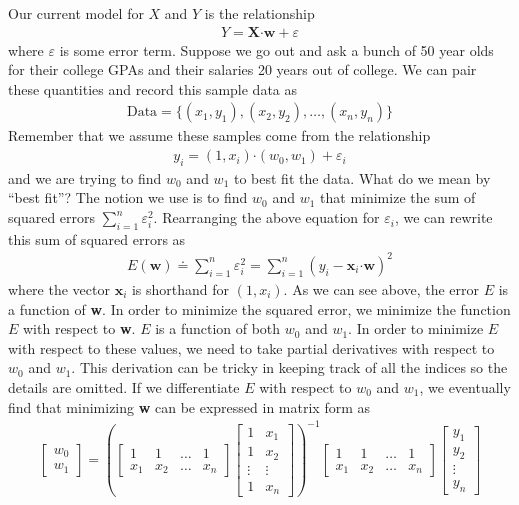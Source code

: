 \documentclass[11pt,letterpaper]{article}
\newcommand\eps{\varepsilon}
\numberwithin{theorem}{section}
\numberwithin{definition}{section}
\numberwithin{lemma}{section}
\numberwithin{corollary}{section}
\numberwithin{proposition}{section}
\theoremstyle{definition}
\numberwithin{remark}{section}
\numberwithin{claim}{section}
\numberwithin{observation}{section}
\numberwithin{fact}{section}
\numberwithin{assumption}{section}
\numberwithin{example}{section}
\numberwithin{exercise}{section}
\begin{document}
Our current model for $X$ and $Y$ is the relationship
\begin{align*}
Y = \textbf{X} \boldsymbol{\cdot} \textbf{w} + \eps
\end{align*}
where $\eps$ is some error term. Suppose we go out and ask a bunch of 50 year olds for their college GPAs and their salaries 20 years out of college. We can pair these quantities and record this sample data as
\begin{align*}
\text{Data} = \{(x_1,y_1),(x_2,y_2),\dots,(x_n,y_n)\}
\end{align*}
Remember that we assume these samples come from the relationship
\begin{align*}
y_i = (1,x_i) \boldsymbol{\cdot} (w_0,w_1) + \eps_i
\end{align*}
and we are trying to find $w_0$ and $w_1$ to best fit the data. What do we mean by ``best fit''? The notion we use is to find $w_0$ and $w_1$ that minimize the sum of squared errors $\sum_{i=1}^n\eps_i^2$. Rearranging the above equation for $\eps_i$, we can rewrite this sum of squared errors as
\begin{align*}
E(\textbf{w}) \doteq \sum_{i=1}^n\eps_i^2 = \sum_{i=1}^n (y_i - \textbf{x}_i \boldsymbol{\cdot} \textbf{w})^2
\end{align*}
where the vector $\textbf{x}_i$ is shorthand for $(1,x_i)$. As we can see above, the error $E$ is a function of \textbf{w}. In order to minimize the squared error, we minimize the function $E$ with respect to \textbf{w}. $E$ is a function of both $w_0$ and $w_1$. In order to minimize $E$ with respect to these values, we need to take partial derivatives with respect to $w_0$ and $w_1$. This derivation can be tricky in keeping track of all the indices so the details are omitted. If we differentiate $E$ with respect to $w_0$ and $w_1$, we eventually find that minimizing \textbf{w} can be expressed in matrix form as
\begin{align*}
\begin{bmatrix}
w_0 \\
w_1
\end{bmatrix} = 
\left(\begin{bmatrix}
1 & 1 & \dots & 1 \\
x_1 & x_2 & \dots & x_n
\end{bmatrix}
\begin{bmatrix}
1 & x_1 \\
1 & x_2 \\
\vdots & \vdots \\
1 & x_n
\end{bmatrix}
\right)^{-1}
\begin{bmatrix}
1 & 1 & \dots & 1 \\
x_1 & x_2 & \dots & x_n
\end{bmatrix}
\begin{bmatrix}
y_1  \\
y_2  \\
\vdots  \\
y_n 
\end{bmatrix}
\end{align*}
\end{document}
